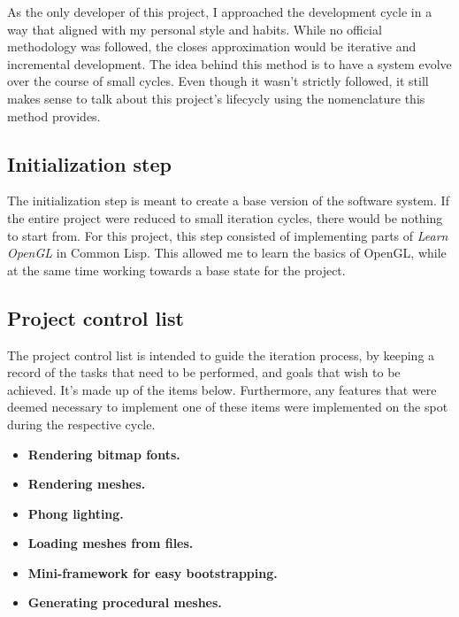 %

As the only developer of this project,
I approached the development cycle in a way that aligned with my personal style and habits.
While no official methodology was followed,
the closes approximation would be iterative and incremental development.
The idea behind this method is to have a system evolve over the course of small cycles.
Even though it wasn't strictly followed,
it still makes sense to talk about this project's lifecycly using the nomenclature this method provides.

\subsection{Initialization step}

The initialization step is meant to create a base version of the software system.
If the entire project were reduced to small iteration cycles,
there would be nothing to start from.
For this project,
this step consisted of implementing parts of \textit{Learn OpenGL}\cite{learnopengl} in Common Lisp.
This allowed me to learn the basics of OpenGL,
while at the same time working towards a base state for the project.

\subsection{Project control list}

The project control list is intended to guide the iteration process,
by keeping a record of the tasks that need to be performed,
and goals that wish to be achieved.
It's made up of the items below.
Furthermore,
any features that were deemed necessary to implement one of these items were implemented on the spot during the respective cycle.

\begin{itemize}
\item \textbf{Rendering bitmap fonts.}
\item \textbf{Rendering meshes.}
\item \textbf{Phong lighting.}
\item \textbf{Loading meshes from files.}
\item \textbf{Mini-framework for easy bootstrapping.}
\item \textbf{Generating procedural meshes.}
\end{itemize}
